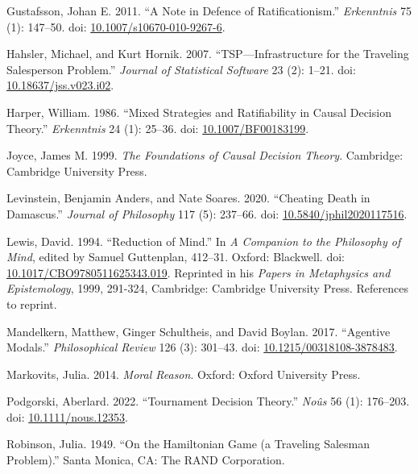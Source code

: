 \documentclass[
  11pt,
  letterpaper,
  DIV=11,
  numbers=noendperiod,
  twoside]{scrartcl}
\newlength{\cslhangindent}
\newenvironment{CSLReferences}[2] %
 {\begin{list}{}{%
  \setlength{\itemindent}{0pt}
  \setlength{\leftmargin}{0pt}
  \setlength{\parsep}{0pt}
  \ifodd #1
   \setlength{\leftmargin}{\cslhangindent}
   \setlength{\itemindent}{-1\cslhangindent}
  \fi
  \setlength{\itemsep}{#2\baselineskip}}}
 {\end{list}}
\begin{document}
\begin{CSLReferences}{1}{0}
Gustafsson, Johan E. 2011. {``A Note in Defence of Ratificationism.''}
\emph{Erkenntnis} 75 (1): 147--50. doi:
\href{https://doi.org/10.1007/s10670-010-9267-6}{10.1007/s10670-010-9267-6}.

Hahsler, Michael, and Kurt Hornik. 2007. {``TSP---Infrastructure for the
Traveling Salesperson Problem.''} \emph{Journal of Statistical Software}
23 (2): 1--21. doi:
\href{https://doi.org/10.18637/jss.v023.i02}{10.18637/jss.v023.i02}.

Harper, William. 1986. {``Mixed Strategies and Ratifiability in Causal
Decision Theory.''} \emph{Erkenntnis} 24 (1): 25--36. doi:
\href{https://doi.org/10.1007/BF00183199}{10.1007/BF00183199}.

Joyce, James M. 1999. \emph{The Foundations of Causal Decision Theory}.
Cambridge: Cambridge University Press.

Levinstein, Benjamin Anders, and Nate Soares. 2020. {``Cheating Death in
Damascus.''} \emph{Journal of Philosophy} 117 (5): 237--66. doi:
\href{https://doi.org/10.5840/jphil2020117516}{10.5840/jphil2020117516}.

Lewis, David. 1994. {``Reduction of Mind.''} In \emph{A Companion to the
Philosophy of Mind}, edited by Samuel Guttenplan, 412--31. Oxford:
Blackwell. doi:
\href{https://doi.org/10.1017/CBO9780511625343.019}{10.1017/CBO9780511625343.019}.
Reprinted in his \emph{Papers in Metaphysics and Epistemology}, 1999,
291-324, Cambridge: Cambridge University Press. References to reprint.

Mandelkern, Matthew, Ginger Schultheis, and David Boylan. 2017.
{``Agentive Modals.''} \emph{Philosophical Review} 126 (3): 301--43.
doi:
\href{https://doi.org/10.1215/00318108-3878483}{10.1215/00318108-3878483}.

Markovits, Julia. 2014. \emph{Moral Reason}. Oxford: Oxford University
Press.

Podgorski, Aberlard. 2022. {``Tournament Decision Theory.''}
\emph{No{û}s} 56 (1): 176--203. doi:
\href{https://doi.org/10.1111/nous.12353}{10.1111/nous.12353}.

Robinson, Julia. 1949. {``On the Hamiltonian Game (a Traveling Salesman
Problem).''} Santa Monica, CA: The RAND Corporation.


\end{CSLReferences}
\end{document}
